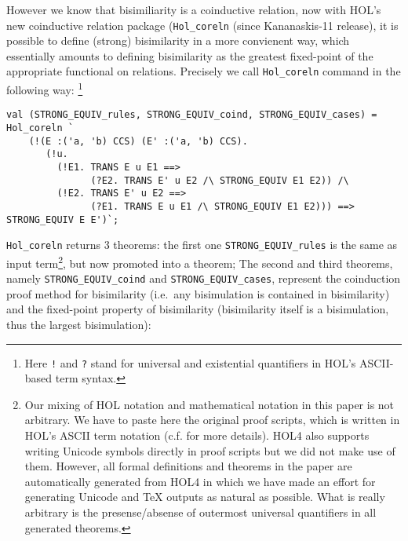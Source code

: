 However we know that bisimiliarity is a coinductive relation, now with HOL's
new coinductive relation package (\texttt{Hol_coreln} (since Kananaskis-11 release),
it is possible to define (strong) bisimilarity in a more convienent way, which
essentially amounts to defining bisimilarity as the greatest
fixed-point of the appropriate functional on relations. Precisely we call 
\texttt{Hol_coreln} command in the following way:%
\footnote{Here {\tt !} and {\tt ?} stand for universal and
existential quantifiers in HOL's ASCII-based term syntax.}
\begin{lstlisting}
val (STRONG_EQUIV_rules, STRONG_EQUIV_coind, STRONG_EQUIV_cases) = Hol_coreln `
    (!(E :('a, 'b) CCS) (E' :('a, 'b) CCS).
       (!u.
         (!E1. TRANS E u E1 ==>
               (?E2. TRANS E' u E2 /\ STRONG_EQUIV E1 E2)) /\
         (!E2. TRANS E' u E2 ==>
               (?E1. TRANS E u E1 /\ STRONG_EQUIV E1 E2))) ==> STRONG_EQUIV E E')`;
\end{lstlisting}
\texttt{Hol_coreln} returns 3 theorems: the first one
\texttt{STRONG_EQUIV_rules} is the
same as input term\footnote{Our mixing of HOL notation and mathematical
  notation in this paper is not arbitrary. We have to paste here the
  original proof scripts, which is written in HOL's ASCII term
  notation (c.f. \cite{holdesc} for more details). HOL4 also supports writing Unicode symbols directly in
  proof scripts but we did not make use of them. However, all formal definitions and
  theorems in the paper are automatically generated from HOL4 in
  which we have made an effort for generating
  Unicode and TeX outputs as natural as possible. What is really
  arbitrary is the presense/absense of outermost universal
  quantifiers in all generated theorems.}, but now promoted into a theorem;
The second and third theorems, namely \texttt{STRONG_EQUIV_coind} and \texttt{STRONG_EQUIV_cases},
represent the coinduction proof method for bisimilarity 
(i.e.~any bisimulation is contained in bisimilarity)
and the fixed-point property of bisimilarity
(bisimilarity itself is a bisimulation, thus the largest
bisimulation):
